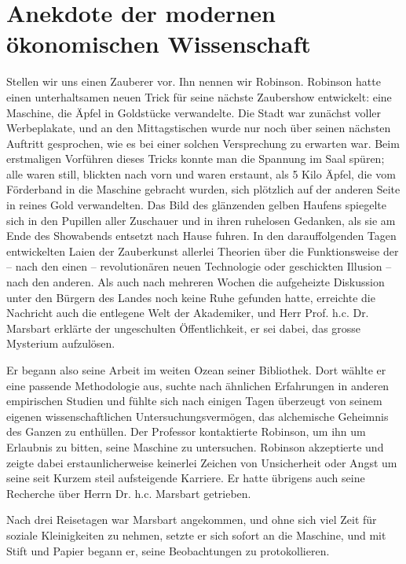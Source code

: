 \pagebreak
{}

\section{Anekdote der modernen ökonomischen Wissenschaft}

Stellen wir uns einen Zauberer vor. Ihn nennen wir Robinson.
Robinson hatte einen unterhaltsamen neuen Trick für seine
nächste Zaubershow entwickelt: eine Maschine, die Äpfel in
Goldstücke verwandelte. Die Stadt war zunächst voller
Werbeplakate, und an den Mittagstischen wurde nur noch über
seinen nächsten Auftritt gesprochen, wie es bei einer solchen
Versprechung zu erwarten war. Beim erstmaligen Vorführen dieses
Tricks konnte man die Spannung im Saal spüren; alle waren
still, blickten nach vorn und waren erstaunt, als 5 Kilo Äpfel,
die vom Förderband in die Maschine gebracht wurden, sich
plötzlich auf der anderen Seite in reines Gold verwandelten.
Das Bild des glänzenden gelben Haufens spiegelte sich in den
Pupillen aller Zuschauer und in ihren ruhelosen Gedanken, als
sie am Ende des Showabends entsetzt nach Hause fuhren. In den
darauffolgenden Tagen entwickelten Laien der Zauberkunst
allerlei Theorien über die Funktionsweise der – nach den einen
– revolutionären neuen Technologie oder geschickten Illusion –
nach den anderen. Als auch nach mehreren Wochen die aufgeheizte
Diskussion unter den Bürgern des Landes noch keine Ruhe
gefunden hatte, erreichte die Nachricht auch die entlegene Welt
der Akademiker, und Herr Prof. h.c. Dr. Marsbart erklärte der
ungeschulten Öffentlichkeit, er sei dabei, das grosse Mysterium
aufzulösen.

Er begann also seine Arbeit im weiten Ozean seiner Bibliothek.
Dort wählte er eine passende Methodologie aus, suchte nach
ähnlichen Erfahrungen in anderen empirischen Studien und fühlte
sich nach einigen Tagen überzeugt von seinem eigenen
wissenschaftlichen Untersuchungsvermögen, das alchemische
Geheimnis des Ganzen zu enthüllen. Der Professor kontaktierte
Robinson, um ihn um Erlaubnis zu bitten, seine Maschine zu
untersuchen. Robinson akzeptierte und zeigte dabei
erstaunlicherweise keinerlei Zeichen von Unsicherheit oder
Angst um seine seit Kurzem steil aufsteigende Karriere. Er
hatte übrigens auch seine Recherche über Herrn Dr. h.c.
Marsbart getrieben.

Nach drei Reisetagen war Marsbart angekommen, und ohne sich
viel Zeit für soziale Kleinigkeiten zu nehmen, setzte er sich
sofort an die Maschine, und mit Stift und Papier begann er,
seine Beobachtungen zu protokollieren.

